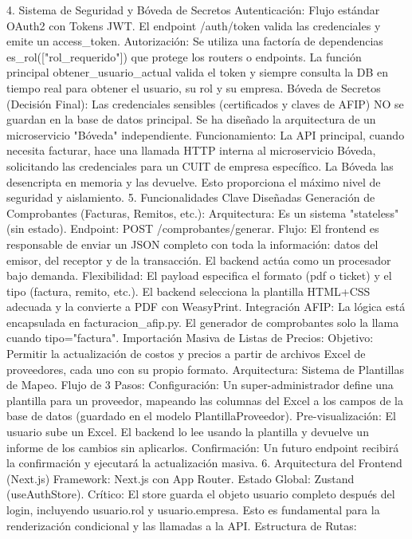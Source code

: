 4. Sistema de Seguridad y Bóveda de Secretos
Autenticación: Flujo estándar OAuth2 con Tokens JWT. El endpoint /auth/token valida las credenciales y emite un access_token.
Autorización: Se utiliza una factoría de dependencias es_rol(["rol_requerido"]) que protege los routers o endpoints. La función principal obtener_usuario_actual valida el token y siempre consulta la DB en tiempo real para obtener el usuario, su rol y su empresa.
Bóveda de Secretos (Decisión Final): Las credenciales sensibles (certificados y claves de AFIP) NO se guardan en la base de datos principal. Se ha diseñado la arquitectura de un microservicio "Bóveda" independiente.
Funcionamiento: La API principal, cuando necesita facturar, hace una llamada HTTP interna al microservicio Bóveda, solicitando las credenciales para un CUIT de empresa específico. La Bóveda las desencripta en memoria y las devuelve. Esto proporciona el máximo nivel de seguridad y aislamiento.
5. Funcionalidades Clave Diseñadas
Generación de Comprobantes (Facturas, Remitos, etc.):
Arquitectura: Es un sistema "stateless" (sin estado).
Endpoint: POST /comprobantes/generar.
Flujo: El frontend es responsable de enviar un JSON completo con toda la información: datos del emisor, del receptor y de la transacción. El backend actúa como un procesador bajo demanda.
Flexibilidad: El payload especifica el formato (pdf o ticket) y el tipo (factura, remito, etc.). El backend selecciona la plantilla HTML+CSS adecuada y la convierte a PDF con WeasyPrint.
Integración AFIP: La lógica está encapsulada en facturacion_afip.py. El generador de comprobantes solo la llama cuando tipo="factura".
Importación Masiva de Listas de Precios:
Objetivo: Permitir la actualización de costos y precios a partir de archivos Excel de proveedores, cada uno con su propio formato.
Arquitectura: Sistema de Plantillas de Mapeo.
Flujo de 3 Pasos:
Configuración: Un super-administrador define una plantilla para un proveedor, mapeando las columnas del Excel a los campos de la base de datos (guardado en el modelo PlantillaProveedor).
Pre-visualización: El usuario sube un Excel. El backend lo lee usando la plantilla y devuelve un informe de los cambios sin aplicarlos.
Confirmación: Un futuro endpoint recibirá la confirmación y ejecutará la actualización masiva.
6. Arquitectura del Frontend (Next.js)
Framework: Next.js con App Router.
Estado Global: Zustand (useAuthStore). Crítico: El store guarda el objeto usuario completo después del login, incluyendo usuario.rol y usuario.empresa. Esto es fundamental para la renderización condicional y las llamadas a la API.
Estructura de Rutas:

